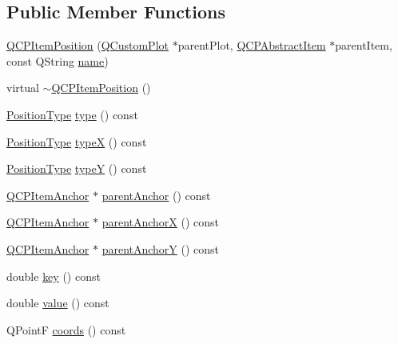 \subsection*{Public Member Functions}
\begin{DoxyCompactItemize}
\item 
\hyperlink{class_q_c_p_item_position_a3efc524f37fdcd22907545eb77555ce4}{Q\+C\+P\+Item\+Position} (\hyperlink{class_q_custom_plot}{Q\+Custom\+Plot} $\ast$parent\+Plot, \hyperlink{class_q_c_p_abstract_item}{Q\+C\+P\+Abstract\+Item} $\ast$parent\+Item, const Q\+String \hyperlink{class_q_c_p_item_anchor_ac93984042a58c875e76847dc3e5f75fe}{name})
\item 
virtual \hyperlink{class_q_c_p_item_position_ad8a289016f7a62332f9c865c39ab2047}{$\sim$\+Q\+C\+P\+Item\+Position} ()
\item 
\hyperlink{class_q_c_p_item_position_aad9936c22bf43e3d358552f6e86dbdc8}{Position\+Type} \hyperlink{class_q_c_p_item_position_aecb709d72c9aa334a7f62e2c9e0b5d60}{type} () const 
\item 
\hyperlink{class_q_c_p_item_position_aad9936c22bf43e3d358552f6e86dbdc8}{Position\+Type} \hyperlink{class_q_c_p_item_position_a3cb68cf9c95be05c66a0f47448e328e5}{type\+X} () const 
\item 
\hyperlink{class_q_c_p_item_position_aad9936c22bf43e3d358552f6e86dbdc8}{Position\+Type} \hyperlink{class_q_c_p_item_position_a8a2fec9dec1ce006a598b32685fd7ab3}{type\+Y} () const 
\item 
\hyperlink{class_q_c_p_item_anchor}{Q\+C\+P\+Item\+Anchor} $\ast$ \hyperlink{class_q_c_p_item_position_a7b4ffab9946945c0e11cd2352dc2e042}{parent\+Anchor} () const 
\item 
\hyperlink{class_q_c_p_item_anchor}{Q\+C\+P\+Item\+Anchor} $\ast$ \hyperlink{class_q_c_p_item_position_a485abba71c8552086c5f68e95dca7f9a}{parent\+Anchor\+X} () const 
\item 
\hyperlink{class_q_c_p_item_anchor}{Q\+C\+P\+Item\+Anchor} $\ast$ \hyperlink{class_q_c_p_item_position_a1502dba801cb20424b7e097399e372de}{parent\+Anchor\+Y} () const 
\item 
double \hyperlink{class_q_c_p_item_position_ac3cb2bddf5f89e5181830be30b93d090}{key} () const 
\item 
double \hyperlink{class_q_c_p_item_position_a6817f7356d3a2b63e8446c6b6106dae1}{value} () const 
\item 
Q\+Point\+F \hyperlink{class_q_c_p_item_position_a253d7adbb6d46299bd6cbc31aa8819f1}{coords} () const 
\item 

\end{DoxyCompactItemize}
